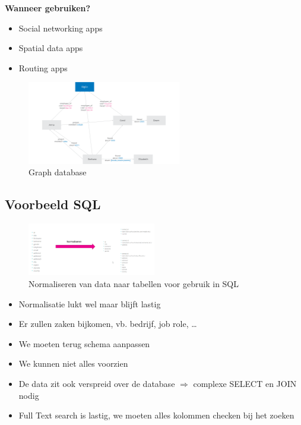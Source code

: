 \documentclass{article}
\newcommand{\bold}[1]{\textbf{#1}}
\begin{document}
\bold{Wanneer gebruiken?}

\begin{itemize}
    \item Social networking apps
    \item Spatial data apps
    \item Routing apps
\end{itemize}

\begin{figure}[H]
    \centering
    \includegraphics[width=0.6\textwidth]{graph-database.png}
    \caption{Graph database}
\end{figure}


\subsection{Voorbeeld SQL}

\begin{figure}[H]
    \centering
    \includegraphics[width=0.5\textwidth]{sql-normaliseren.png}
    \caption{Normaliseren van data naar tabellen voor gebruik in SQL}
\end{figure}

\begin{itemize}
    \item Normalisatie lukt wel maar blijft lastig
    \item Er zullen zaken bijkomen, vb. bedrijf, job role, \dots
    \item We moeten terug schema aanpassen
    \item We kunnen niet alles voorzien
    \item De data zit ook verspreid over de database $\Rightarrow$ complexe SELECT en JOIN nodig
    \item Full Text search is lastig, we moeten alles kolommen checken bij het zoeken
\end{itemize}
\end{document}
